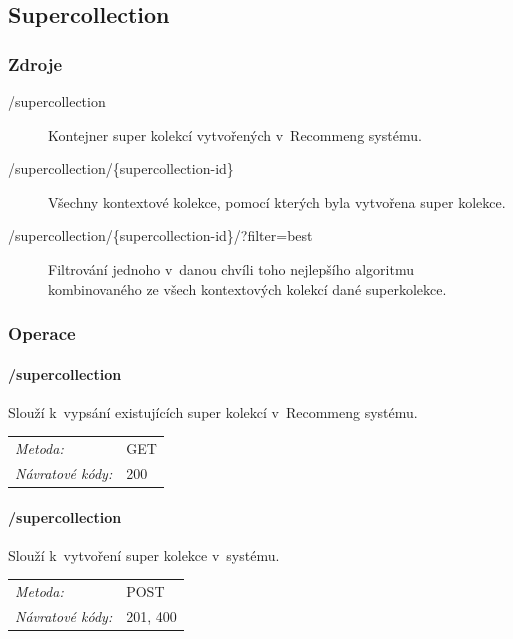 \documentclass[thesis=M,czech]{FITthesis}[2014/05/07]
\begin{document}
\subsection{Supercollection}

\subsubsection{Zdroje}

\begin{description}
	\item[/supercollection] Kontejner super kolekcí vytvořených v~Recommeng systému.
	\item[/supercollection/\{supercollection-id\}] Všechny kontextové kolekce, pomocí kterých byla vytvořena super kolekce.
	\item[/supercollection/\{supercollection-id\}/?filter=best] Filtrování jednoho v~danou chvíli toho nejlepšího algoritmu kombinovaného ze všech kontextových kolekcí dané superkolekce.
\end{description}

\subsubsection{Operace}

\paragraph*{/supercollection}

Slouží k~vypsání existujících super kolekcí v~Recommeng systému.

\begin{center}
 	\begin{tabular}{lp{10cm}}
 		\textit{Metoda:}		& GET			\tabularnewline 
 		\textit{Návratové kódy:}		& 200			\tabularnewline 		
 	\end{tabular}	
\end{center} 

\paragraph*{/supercollection}

Slouží k~vytvoření super kolekce v~systému.

\begin{center}
 	\begin{tabular}{lp{10cm}}
 		\textit{Metoda:}		& POST			\tabularnewline 
 		\textit{Návratové kódy:}		& 201, 400			\tabularnewline 		
 	\end{tabular}	
\end{center} 
\end{document}
